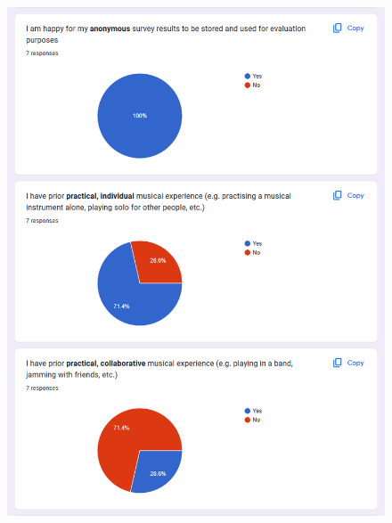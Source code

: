 \begin{appendices}
\begin{figure}[htb]
    \centering
    \includegraphics[width=0.8\linewidth]{images/survey-results/1.png}    
\end{figure}
\begin{figure}[htb]
    \centering

\end{figure}
\end{appendices}
